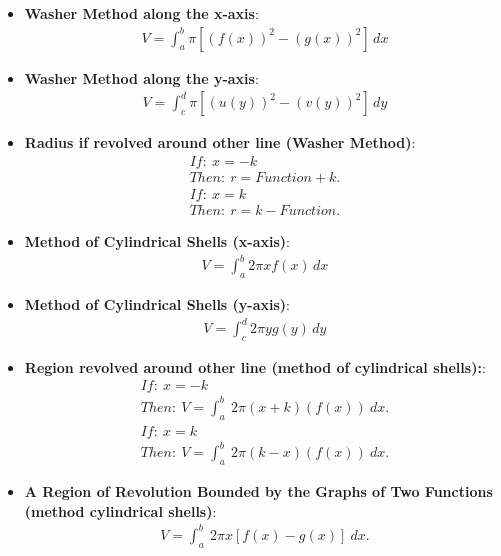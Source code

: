 \documentclass{report}
\begin{document}
\begin{itemize}
        \item \textbf{Washer Method along the x-axis}:
            \begin{align}
                V = \int_{a}^{b} \pi [(f(x))^2 - (g(x))^2] \, dx
            \end{align}

        \item \textbf{Washer Method along the y-axis}:
            \begin{align}
                V = \int_{c}^{d} \pi [(u(y))^2 - (v(y))^2] \, dy
            \end{align}

        \item \textbf{Radius if revolved around other line (Washer Method)}:
            \begin{align*}
                If:\ x=-k\\
                Then:\ r = Function + k
            .\end{align*}
            \begin{align*}
                If:\ x=k\\
                Then:\ r = k - Function
            .\end{align*}

        \item \textbf{Method of Cylindrical Shells (x-axis)}:
            \begin{align}
                V = \int_{a}^{b} 2\pi x f(x) \, dx
            \end{align}

        \item \textbf{Method of Cylindrical Shells (y-axis)}:
            \begin{align}
                V = \int_{c}^{d} 2\pi y g(y) \, dy
            \end{align}

        \item \textbf{Region revolved around other line (method of cylindrical shells):}:
            \begin{align*}
                If:\ x=-k \\
                Then:\ V = \int_{a}^{b}\ 2\pi (x+k)(f(x))\ dx
            .\end{align*}
            \begin{align*}
                If:\ x=k \\
                Then:\ V = \int_{a}^{b}\ 2\pi (k-x)(f(x))\ dx
            .\end{align*}
        \item \textbf{A Region of Revolution Bounded by the Graphs of Two Functions (method cylindrical shells)}:
            \begin{align*}
                V = \int_{a}^{b}\ 2\pi x\left[f(x)-g(x)\right]\ dx
            .\end{align*}


\end{itemize}
\end{document}
